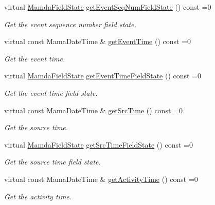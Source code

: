 \begin{CompactItemize}
virtual \hyperlink{namespaceWombat_93aac974f2ab713554fd12a1fa3b7d2a}{Mamda\-Field\-State} \hyperlink{classWombat_1_1MamdaBasicEvent_51cc0b9d4c2b8a982ccd18b339707cb5}{get\-Event\-Seq\-Num\-Field\-State} () const =0
\begin{CompactList}\small\item\em Get the event sequence number field state. \item\end{CompactList}\item 
virtual const Mama\-Date\-Time \& \hyperlink{classWombat_1_1MamdaBasicEvent_7285491c2c657207a64b1b0449c0339b}{get\-Event\-Time} () const =0
\begin{CompactList}\small\item\em Get the event time. \item\end{CompactList}\item 
virtual \hyperlink{namespaceWombat_93aac974f2ab713554fd12a1fa3b7d2a}{Mamda\-Field\-State} \hyperlink{classWombat_1_1MamdaBasicEvent_ff3932065e16e660fb6cd9285b46f7d0}{get\-Event\-Time\-Field\-State} () const =0
\begin{CompactList}\small\item\em Get the event time field state. \item\end{CompactList}\item 
virtual const Mama\-Date\-Time \& \hyperlink{classWombat_1_1MamdaBasicEvent_60b5d51f3799c4762090505ef5b213e9}{get\-Src\-Time} () const =0
\begin{CompactList}\small\item\em Get the source time. \item\end{CompactList}\item 
virtual \hyperlink{namespaceWombat_93aac974f2ab713554fd12a1fa3b7d2a}{Mamda\-Field\-State} \hyperlink{classWombat_1_1MamdaBasicEvent_9cd58f3d7b5ebea42fa86e5dde46ab18}{get\-Src\-Time\-Field\-State} () const =0
\begin{CompactList}\small\item\em Get the source time field state. \item\end{CompactList}\item 
virtual const Mama\-Date\-Time \& \hyperlink{classWombat_1_1MamdaBasicEvent_b3810afc69474ef3b192ee4c9307e714}{get\-Activity\-Time} () const =0
\begin{CompactList}\small\item\em Get the activity time. \item\end{CompactList}\item 

\end{CompactItemize}
